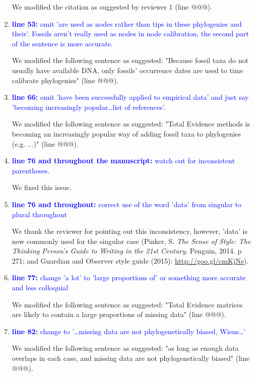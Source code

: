 \documentclass[12pt,letterpaper]{article}
\begin{document}
\begin{enumerate}
We modified the citation as suggested by reviewer 1 (line @@@).

\item{\textcolor{blue}{\textbf{line 53:} omit 'are used as nodes rather than tips in these phylogenies and their'. Fossils aren't really used as nodes in node calibration, the second part of the sentence is more accurate.}}

We modified the following sentence as suggested: "Because fossil taxa do not usually have available DNA, only fossils' occurrence dates are used to time calibrate phylogenies" (line @@@).

\item{\textcolor{blue}{\textbf{line 66:} omit 'have been successfully applied to empirical data' and just say 'becoming increasingly popular…list of references'. }}

We modified the following sentence as suggested: "Total Evidence methods is becoming an increasingly popular way of adding fossil taxa to phylogenies (e.g. ...)" (line @@@).

\item{\textcolor{blue}{\textbf{line 76 and throughout the manuscript:} watch out for inconsistent parentheses.}}

We fixed this issue.

\item{\textcolor{blue}{\textbf{line 76 and throughout:} correct use of the word 'data' from singular to plural throughout}}

We thank the reviewer for pointing out this inconsistency, however, 'data' is now commonly used for the singular case (Pinker, S. \textit{The Sense of Style: The Thinking Person's Guide to Writing in the 21st Century}. Penguin, 2014. p 271; and Guardian and Observer style guide (2015): \url{http://goo.gl/cmKjNe}).

\item{\textcolor{blue}{\textbf{line 77:} change 'a lot' to 'large proportions of' or something more accurate and less colloquial}}

We modified the following sentence as suggested: "Total Evidence matrices are likely to contain a large proportions of missing data" (line @@@).

\item{\textcolor{blue}{\textbf{line 82:} change to '…missing data are not phylogenetically biased, Wiens…'}}

We modified the following sentence as suggested: "as long as enough data overlaps in each case, and missing data are not phylogenetically biased" (line @@@).


\end{enumerate}
\end{document}
